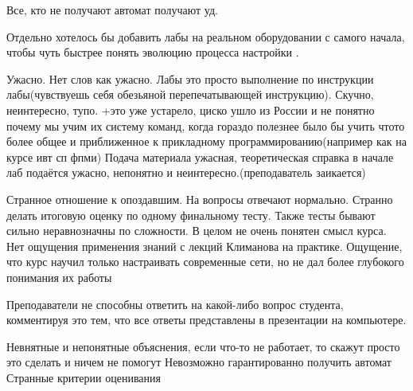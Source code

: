             \begin{commentbox} 
                Все, кто не получают автомат получают уд.  
            \end{commentbox} 
        
            \begin{commentbox} 
                Отдельно хотелось бы добавить лабы на реальном оборудовании с самого начала, чтобы чуть быстрее понять эволюцию процесса настройки . 
            \end{commentbox} 
        
            \begin{commentbox} 
                Ужасно. Нет слов как ужасно. Лабы это просто выполнение по инструкции лабы(чувствуешь себя обезьяной перепечатывающей инструкцию). Скучно, неинтересно, тупо. +это уже устарело, циско ушло из России и не понятно почему мы учим их систему команд, когда гораздо полезнее было бы учить чтото более общее и приближенное к прикладному программированию(например как на курсе ивт сп фпми) Подача материала ужасная, теоретическая справка в начале лаб подаётся ужасно, непонятно и неинтересно.(преподаватель заикается) 
            \end{commentbox} 
        
            \begin{commentbox} 
                Странное отношение к опоздавшим. На вопросы отвечают нормально.
                Странно делать итоговую оценку по одному финальному тесту. Также тесты бывают сильно неравнозначны по сложности. 
                В целом не очень понятен смысл курса. Нет ощущения применения знаний с лекций Климанова на практике. Ощущение, что курс научил только настраивать современные сети, но не дал более глубокого понимания их работы 
            \end{commentbox} 
        
            \begin{commentbox} 
                Преподаватели не способны ответить на какой-либо вопрос студента, комментируя это тем, что все ответы представлены в презентации на компьютере. 
            \end{commentbox} 
        
            \begin{commentbox} 
                Невнятные и непонятные объяснения, если что-то не работает, то скажут просто это сделать и ничем не помогут
                Невозможно гарантированно получить автомат
                Странные критерии оценивания 
            \end{commentbox} 
        
